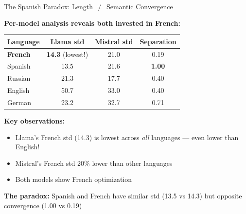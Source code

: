 \documentclass[aspectratio=169,11pt]{beamer}
\newcommand{\good}{\textcolor{darkgreen}{\ding{51}}}
\begin{document}
\begin{frame}{The Spanish Paradox: Length $\neq$ Semantic Convergence}

\textbf{Per-model analysis reveals both invested in French:}

\vspace{0.5em}

\begin{center}
\begin{tabular}{lccc}
\toprule
\textbf{Language} & \textbf{Llama std} & \textbf{Mistral std} & \textbf{Separation} \\
\midrule
\textbf{French} & \textbf{14.3} (lowest!) & 21.0 & 0.19 \\
Spanish & 13.5 & 21.6 & \textbf{1.00} \\
Russian & 21.3 & 17.7 & 0.40 \\
English & 50.7 & 33.0 & 0.40 \\
German & 23.2 & 32.7 & 0.71 \\
\bottomrule
\end{tabular}
\end{center}

\vspace{0.5em}

\textbf{Key observations:}
\begin{itemize}
  \item Llama's French std (14.3) is lowest across \emph{all} languages — even lower than English!
  \item Mistral's French std 20\% lower than other languages
  \item Both models show French optimization \good
\end{itemize}

\vspace{0.5em}

\textbf{The paradox:} Spanish and French have similar std (13.5 vs 14.3) but opposite convergence (1.00 vs 0.19)

\end{frame}
\end{document}
